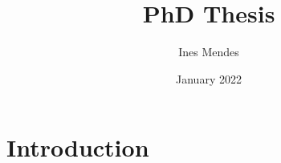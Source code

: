 \documentclass{article}
\title{PhD Thesis}
\author{Ines Mendes}
\date{January 2022}
\begin{document}
\maketitle

\section{Introduction}
\end{document}
